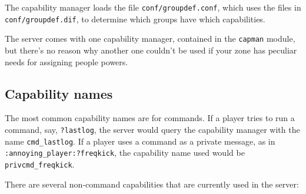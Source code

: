 \documentclass{article}
\begin{document}
The capability manager loads the file \texttt{conf/groupdef.conf}, which
uses the files in \texttt{conf/groupdef.dif}, to determine which groups
have which capabilities.

The server comes with one capability manager, contained in the
\texttt{capman} module, but there's no reason why another one couldn't
be used if your zone has peculiar needs for assigning people powers.

\subsection{Capability names}

The most common capability names are for commands. If a player tries to
run a command, say, \verb/?lastlog/, the server would query the
capability manager with the name \verb/cmd_lastlog/. If a player uses a
command as a private message, as in \verb/:annoying_player:?freqkick/,
the capability name used would be \verb/privcmd_freqkick/.

There are several non-command capabilities that are currently used in
the server:
\end{document}
